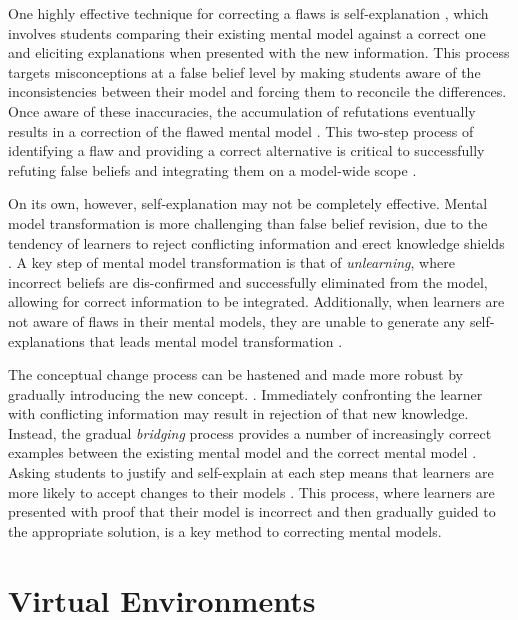 One highly effective technique for correcting a flaws is self-explanation \citep{Chi1994}, which involves students comparing their existing mental model against a correct one and eliciting explanations when presented with the new information. This process targets misconceptions at a false belief level by making students aware of the inconsistencies between their model and forcing them to reconcile the differences. Once aware of these inaccuracies, the accumulation of refutations eventually results in a correction of the flawed mental model \citep{Chi2008}. This two-step process of identifying a flaw and providing a correct alternative is critical to successfully refuting false beliefs and integrating them on a model-wide scope \citep{Chi1994, Klein2006}.

On its own, however, self-explanation may not be completely effective. Mental model transformation is more challenging than false belief revision, due to the tendency of learners to reject conflicting information and erect knowledge shields \citep{Klein2006}. A key step of mental model transformation is that of \emph{unlearning}, where incorrect beliefs are dis-confirmed and successfully eliminated from the model, allowing for correct information to be integrated. Additionally, when learners are not aware of flaws in their mental models, they are unable to generate any self-explanations \citep{Chi2002} that leads mental model transformation \citep{Chi2008}.

The conceptual change process can be hastened and made more robust by gradually introducing the new concept. \citep{Klein2006}. Immediately confronting the learner with conflicting information may result in rejection of that new knowledge. Instead, the gradual \emph{bridging} process provides a number of increasingly correct examples between the existing mental model and the correct mental model \citep{Brown1989}. Asking students to justify and self-explain at each step means that learners are more likely to accept changes to their models \citep{Brown1989, Chi2008, Chi1994, Klein2006}. This process, where learners are presented with proof that their model is incorrect and then gradually guided to the appropriate solution, is a key method to correcting mental models.

\section{Virtual Environments}


